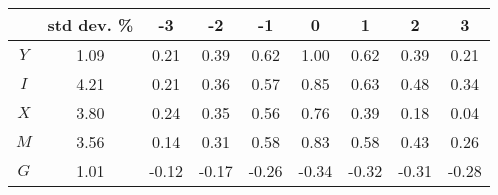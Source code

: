 \begin{tabular}{ccccccccc}
\toprule
 & std dev. \% & -3 & -2 & -1 & 0 & 1 & 2 & 3 \\
\midrule
$Y$ & 1.09 & 0.21 & 0.39 & 0.62 & 1.00 & 0.62 & 0.39 & 0.21 \\
$I$ & 4.21 & 0.21 & 0.36 & 0.57 & 0.85 & 0.63 & 0.48 & 0.34 \\
$X$ & 3.80 & 0.24 & 0.35 & 0.56 & 0.76 & 0.39 & 0.18 & 0.04 \\
$M$ & 3.56 & 0.14 & 0.31 & 0.58 & 0.83 & 0.58 & 0.43 & 0.26 \\
$G$ & 1.01 & -0.12 & -0.17 & -0.26 & -0.34 & -0.32 & -0.31 & -0.28 \\
\bottomrule
\end{tabular}
